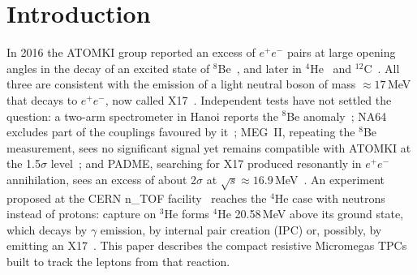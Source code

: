 \section{Introduction}\label{sec:intro}

In 2016 the ATOMKI group reported an excess of $e^+e^-$ pairs at large opening angles in the decay of an excited
state of $^8$Be~\cite{Krasznahorkay2016}, and later in $^4$He~\cite{Krasznahorkay2021} and
$^{12}$C~\cite{Krasznahorkay2022}. All three are consistent with the emission of a light neutral boson of mass
${\approx}17$\,MeV that decays to $e^+e^-$, now called X17~\cite{Feng2016}. Independent tests have not settled the question:
a two-arm spectrometer in Hanoi reports the $^8$Be anomaly~\cite{Anh2024}; NA64 excludes part of the couplings
favoured by it~\cite{NA64_2018,NA64_2020}; MEG~II, repeating the $^8$Be measurement, sees no significant signal yet
remains compatible with ATOMKI at the 1.5$\sigma$ level~\cite{MEGII2024}; and PADME, searching for X17 produced
resonantly in $e^+e^-$ annihilation, sees an excess of about 2$\sigma$ at $\sqrt{s}\approx16.9$\,MeV~\cite{PADME2025}.
An experiment proposed at the CERN n\_TOF facility~\cite{nTOFX17proposal,Gustavino2025} reaches the $^4$He case with
neutrons instead of protons: capture on $^3$He forms $^4$He 20.58\,MeV above its ground state, which decays by
$\gamma$ emission, by internal pair creation (IPC) or, possibly, by emitting an X17~\cite{Viviani2022}. This paper
describes the compact resistive Micromegas TPCs built to track the leptons from that reaction.

